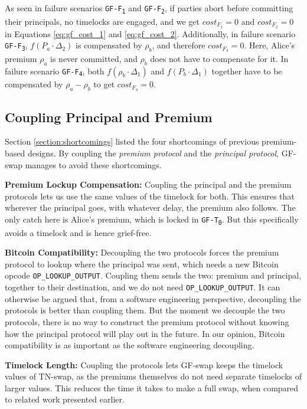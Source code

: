As seen in failure scenarios \texttt{GF-F\textsubscript{1}} and \texttt{GF-F\textsubscript{2}}, if parties abort before committing their principals, no timelocks are engaged, and we get $cost_{F_1} = 0$ and $cost_{F_2} = 0$ in Equations \ref{eq:gf_cost_1} and \ref{eq:gf_cost_2}. Additionally, in failure scenario \texttt{GF-F\textsubscript{3}}, $f(P_a\cdot\Delta_2)$ is compensated by $\rho_b$, and therefore $cost_{F_3} = 0$. Here, Alice's premium $\rho_a$ is never committed, and $\rho_b$ does not have to compensate for it. In failure scenario \texttt{GF-F\textsubscript{4}}, both $f(\rho_b\cdot\Delta_1)$ and $f(P_b\cdot\Delta_1)$ together have to be compensated by $\rho_a - \rho_b$ to get $cost_{F_4} = 0$. 
 
\subsection{Coupling Principal and Premium}
Section \ref{section:shortcomings} listed the four shortcomings of previous premium-based designs. By coupling the \textit{premium protocol} and the \textit{principal protocol}, GF-swap manages to avoid these shortcomings.

\bigbreak
\noindent
\textbf{Premium Lockup Compensation:} Coupling the principal and the premium protocols lets us use the same values of the timelock for both. This ensures that wherever the principal goes, with whatever delay, the premium also follows. The only catch here is Alice's premium, which is locked in \texttt{GF-T\textsubscript{0}}. But this specifically avoids a timelock and is hence grief-free.

\bigbreak
\noindent
\textbf{Bitcoin Compatibility:} Decoupling the two protocols forces the premium protocol to lookup where the principal was sent, which needs a new Bitcoin opcode \texttt{OP\_LOOKUP\_OUTPUT}. Coupling them sends the two: premium and principal, together to their destination, and we do not need \texttt{OP\_LOOKUP\_OUTPUT}. It can otherwise be argued that, from a software engineering perspective, decoupling the protocols is better than coupling them. But the moment we decouple the two protocols, there is no way to construct the premium protocol without knowing how the principal protocol will play out in the future. In our opinion, Bitcoin compatibility is as important as the software engineering decoupling.

\bigbreak
\noindent
\textbf{Timelock Length:} Coupling the protocols lets GF-swap keeps the timelock values of TN-swap, as the premiums themselves do not need separate timelocks of larger values. This reduces the time it takes to make a full swap, when compared to related work presented earlier.

